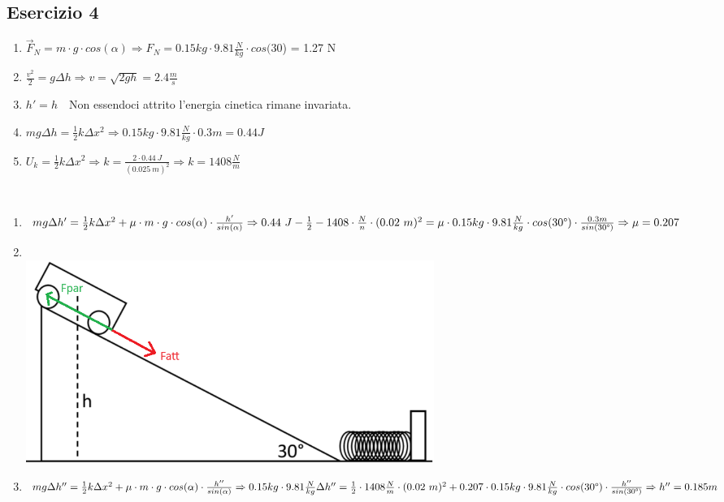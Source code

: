 \documentclass{article}
\begin{document}
\subsection*{Esercizio 4}
\begin{enumerate}[label=\textbf{4a.\alph*)}]
    \item $\vec{F}_N = m\cdot g\cdot cos(\alpha) \Rightarrow F_N = 0.15kg \cdot 9.81 \frac{N}{kg}
        \cdot cos(30$\textdegree) = 1.27 N
    \item $\frac{v^2}{2}=g\Delta h \Rightarrow v=\sqrt{2gh} =2.4\frac{m}{s}$
    \item $h'= h$\ \textrightarrow\ Non essendoci attrito l'energia cinetica rimane invariata.
    \item $mg\Delta h=\frac{1}{2}k\Delta x^2 \Rightarrow 0.15kg\cdot 9.81 \frac{N}{kg}\cdot 0.3m = 0.44 J$
    \item $U_k = \frac{1}{2}k\Delta x^2 \Rightarrow k=\frac{2\cdot 0.44\ J}{(0.025\ m)^2}
        \Rightarrow k=1408 \frac{N}{m}$
\end{enumerate} \phantom{}\\
\begin{enumerate}[label=\textbf{4b.\alph*)}]
    \item $mg\Delta h'=\frac{1}{2}k\Delta x^2 + \mu \cdot m\cdot g\cdot cos(\alpha)\cdot \frac{h'}{sin(\alpha)}\\
        \Rightarrow 0.44\ J - \frac{1}{2}-1408\cdot \frac{N}{n}\cdot (0.02\ m)^2=\mu \cdot 0.15kg\cdot 9.81 \frac{N}{kg}\cdot 
        cos(30\text{\textdegree})\cdot \frac{0.3m}{sin(30\text{\textdegree})}\\
        \Rightarrow \mu = 0.207$
    \item \phantom{}\\ \includegraphics[width=0.6\textwidth]{Esercizio 4 - Forze.png}
    \item $mg\Delta h''=\frac{1}{2}k\Delta x^2 + \mu \cdot m\cdot g\cdot cos(\alpha)\cdot \frac{h''}{sin(\alpha)}\\
        \Rightarrow 0.15kg \cdot 9.81\frac{N}{kg}\Delta h''=\frac{1}{2}\cdot 1408 \frac{N}{m}
        \cdot (0.02\ m)^2 + 0.207 \cdot 0.15kg\cdot 9.81\frac{N}{kg}\cdot cos(30\text{\textdegree})
        \cdot \frac{h''}{sin(30\text{\textdegree})}\\
        \Rightarrow h'' = 0.185m$
\end{enumerate}
\end{document}
